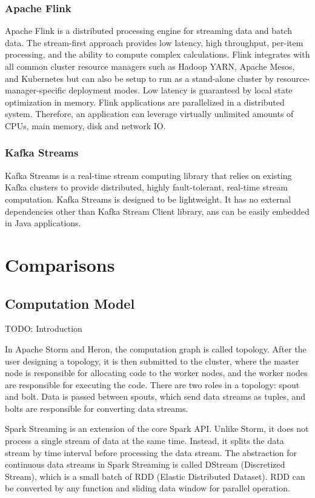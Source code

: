 \documentclass[pdftex,twocolumn,10pt,letterpaper]{article}
\begin{document}
\subsubsection{Apache Flink}

Apache Flink is a distributed processing engine for streaming data and batch data. The stream-first approach provides low latency, high throughput, per-item processing, and the ability to compute complex calculations. Flink integrates with all common cluster resource managers such as Hadoop YARN, Apache Mesos, and Kubernetes but can also be setup to run as a stand-alone cluster by resource-manager-specific deployment modes. Low latency is guaranteed by local state optimization in memory. Flink applications are parallelized in a distributed system. Therefore, an application can leverage virtually unlimited amounts of CPUs, main memory, disk and network IO. 

\subsubsection{Kafka Streams}
Kafka Streams is a real-time stream computing library that relies on existing Kafka clusters to provide distributed, highly fault-tolerant, real-time stream computation. Kafka Streams is designed to be lightweight. It has no external dependencies other than Kafka Stream Client library, ans can be easily embedded in Java applications. 

\section{Comparisons}

\subsection{Computation Model}

TODO: Introduction

In Apache Storm and Heron, the computation graph is called topology. After the user designing a topology, it is then submitted to the cluster, where the master node is responsible for allocating code to the worker nodes, and the worker nodes are responsible for executing the code. There are two roles in a topology: spout and bolt. Data is passed between spouts, which send data streams as  tuples, and bolts are responsible for converting data streams.

Spark Streaming is an extension of the core Spark API. Unlike Storm, it does not process a single stream of data at the same time. Instead, it splits the data stream by time interval before processing the data stream. The abstraction for continuous data streams in Spark Streaming is called DStream (Discretized Stream), which is a small batch of RDD (Elastic Distributed Dataset). RDD can be converted by any function and sliding data window for parallel operation.
\end{document}
